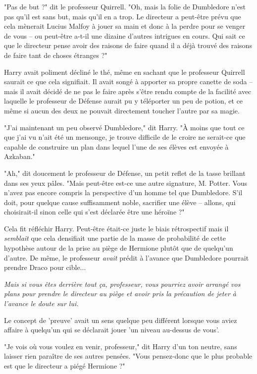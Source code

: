 "Pas de but ?" dit le professeur Quirrell. "Oh, mais la folie de Dumbledore n'est pas qu'il est sans but, mais qu'il en a trop. Le directeur a peut-être prévu que cela mènerait Lucius Malfoy à jouer sa main et donc à la perdre pour se venger de vous – ou peut-être a-t-il une dizaine d'autres intrigues en cours. Qui sait ce que le directeur pense avoir des raisons de faire quand il a déjà trouvé des raisons de faire tant de choses étranges ?"

Harry avait poliment décliné le thé, même en sachant que le professeur Quirrell saurait ce que cela signifiait. Il avait songé à apporter sa propre canette de soda – mais il avait décidé de ne pas le faire après s'être rendu compte de la facilité avec laquelle le professeur de Défense aurait pu y téléporter un peu de potion, et ce même si aucun des deux ne pouvait directement toucher l'autre par sa magie.

"J'ai maintenant un peu observé Dumbledore," dit Harry. "À moins que tout ce que j'ai vu n'ait été un mensonge, je trouve difficile de le croire ne serait-ce que capable de construire un plan dans lequel l'une de ses élèves est envoyée à Azkaban."

"Ah," dit doucement le professeur de Défense, un petit reflet de la tasse brillant dans ses yeux pâles. "Mais peut-être est-ce une autre signature, M. Potter. Vous n'avez pas encore compris la perspective d'un homme tel que Dumbledore. S'il doit, pour quelque cause suffisamment noble, sacrifier une élève – allons, qui choisirait-il sinon celle qui s'est déclarée être une héroïne ?"

Cela fit réfléchir Harry. Peut-être était-ce juste le biais rétrospectif mais il \emph{semblait}  que cela densifiait une partie de la masse de probabilité de cette hypothèse autour de la prise au piège de Hermione plutôt que de quelqu'un d'autre. De même, le professeur \emph{avait}  prédit à l'avance que Dumbledore pourrait prendre Draco pour cible...

\emph{Mais si vous êtes derrière tout ça, professeur, vous pourriez avoir arrangé vos plans pour prendre le directeur au piège et avoir pris la précaution de jeter à l'avance le doute sur lui.} 

Le concept de 'preuve' avait un sens quelque peu différent lorsque vous aviez affaire à quelqu'un qui se déclarait jouer 'un niveau au-dessus de vous'.

"Je vois où vous voulez en venir, professeur," dit Harry d'un ton neutre, sans laisser rien paraître de ses autres pensées. "Vous pensez-donc que le plus probable est que le directeur a piégé Hermione ?"

